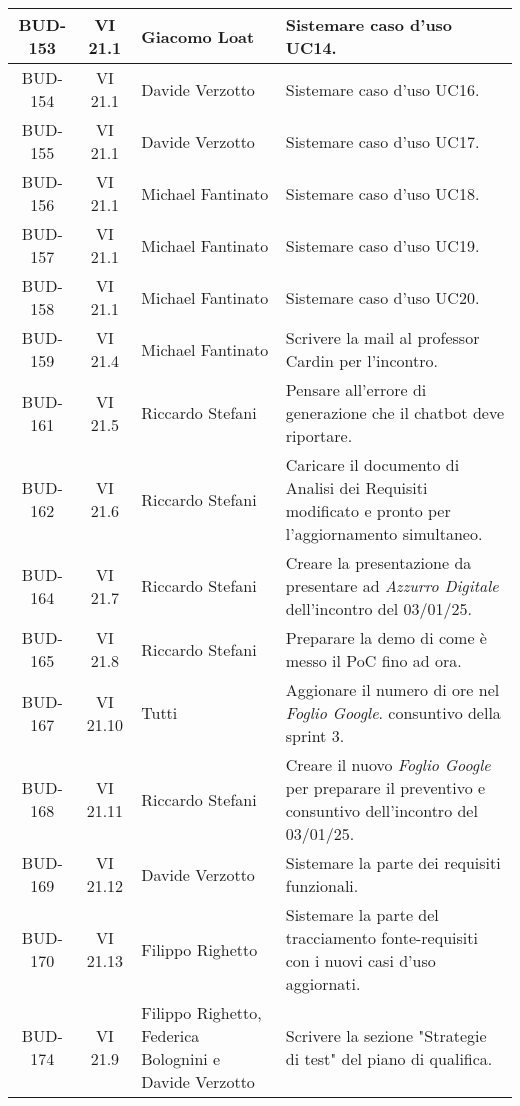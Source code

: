 \begin{table}[htbp]
\begin{tabular}{|c|c|p{}|p{}|}
    \hline
    BUD-153 & VI 21.1 & Giacomo Loat & Sistemare caso d'uso UC14. \\
    \hline
    BUD-154 & VI 21.1 & Davide Verzotto & Sistemare caso d'uso UC16. \\
    \hline
    BUD-155 & VI 21.1 & Davide Verzotto & Sistemare caso d'uso UC17. \\
    \hline
    BUD-156 & VI 21.1 & Michael Fantinato & Sistemare caso d'uso UC18. \\
    \hline
    BUD-157 & VI 21.1 & Michael Fantinato & Sistemare caso d'uso UC19. \\
    \hline
    BUD-158 & VI 21.1 & Michael Fantinato & Sistemare caso d'uso UC20. \\
    \hline
    BUD-159 & VI 21.4 & Michael Fantinato & Scrivere la mail al professor Cardin per l'incontro. \\
    \hline
    BUD-161 & VI 21.5 & Riccardo Stefani & Pensare all'errore di generazione che il chatbot deve riportare. \\
    \hline
    BUD-162 & VI 21.6 & Riccardo Stefani & Caricare il documento di Analisi dei Requisiti modificato e pronto per l'aggiornamento simultaneo. \\
    \hline
    BUD-164 & VI 21.7 & Riccardo Stefani & Creare la presentazione da presentare ad \emph{Azzurro Digitale} dell'incontro del 03/01/25. \\
    \hline
    BUD-165 & VI 21.8 & Riccardo Stefani & Preparare la demo di come è messo il PoC fino ad ora. \\
    \hline
    BUD-167 & VI 21.10 & Tutti & Aggionare il numero di ore nel \emph{Foglio Google}. consuntivo della sprint 3. \\
    \hline
    BUD-168 & VI 21.11 & Riccardo Stefani & Creare il nuovo \emph{Foglio Google} per preparare il preventivo e consuntivo dell'incontro del 03/01/25. \\
    \hline
    BUD-169 & VI 21.12 & Davide Verzotto & Sistemare la parte dei requisiti funzionali. \\
    \hline
    BUD-170 & VI 21.13 & Filippo Righetto & Sistemare la parte del tracciamento fonte-requisiti con i nuovi casi d'uso aggiornati. \\
    \hline
    BUD-174 & VI 21.9 & Filippo Righetto, Federica Bolognini e Davide Verzotto & Scrivere la sezione "Strategie di test" del piano di qualifica. \\
    \hline
    

\end{tabular}
\end{table}



